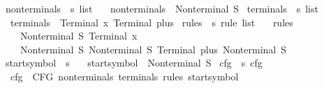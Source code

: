 \begin{isabellebody}
\isanewline
{}\isamarkupfalse%
\ nonterminals{}\ {\isacharcolon}{\kern0pt}{\isacharcolon}{\kern0pt}\ {\isachardoublequoteopen}s{}\ list{\isachardoublequoteclose}\ \isanewline
\ \ {\isachardoublequoteopen}nonterminals{}\ {\isacharequal}{\kern0pt}\ {\isacharbrackleft}{\kern0pt}Nonterminal\ S{\isacharbrackright}{\kern0pt}{\isachardoublequoteclose}\isanewline
\isanewline
{}\isamarkupfalse%
\ terminals{}\ {\isacharcolon}{\kern0pt}{\isacharcolon}{\kern0pt}\ {\isachardoublequoteopen}s{}\ list{\isachardoublequoteclose}\ \isanewline
\ \ {\isachardoublequoteopen}terminals{}\ {\isacharequal}{\kern0pt}\ {\isacharbrackleft}{\kern0pt}Terminal\ x{\isacharcomma}{\kern0pt}\ Terminal\ plus{\isacharbrackright}{\kern0pt}{\isachardoublequoteclose}\isanewline
\isanewline
{}\isamarkupfalse%
\ rules{}\ {\isacharcolon}{\kern0pt}{\isacharcolon}{\kern0pt}\ {\isachardoublequoteopen}s{}\ rule\ list{\isachardoublequoteclose}\ \isanewline
\ \ {\isachardoublequoteopen}rules{}\ {\isacharequal}{\kern0pt}\ {\isacharbrackleft}{\kern0pt}\isanewline
\ \ \ \ {\isacharparenleft}{\kern0pt}Nonterminal\ S{\isacharcomma}{\kern0pt}\ {\isacharbrackleft}{\kern0pt}Terminal\ x{\isacharbrackright}{\kern0pt}{\isacharparenright}{\kern0pt}{\isacharcomma}{\kern0pt}\isanewline
\ \ \ \ {\isacharparenleft}{\kern0pt}Nonterminal\ S{\isacharcomma}{\kern0pt}\ {\isacharbrackleft}{\kern0pt}Nonterminal\ S{\isacharcomma}{\kern0pt}\ Terminal\ plus{\isacharcomma}{\kern0pt}\ Nonterminal\ S{\isacharbrackright}{\kern0pt}{\isacharparenright}{\kern0pt}\isanewline
\ \ {\isacharbrackright}{\kern0pt}{\isachardoublequoteclose}\isanewline
\isanewline
{}\isamarkupfalse%
\ start{\isacharunderscore}{\kern0pt}symbol{}\ {\isacharcolon}{\kern0pt}{\isacharcolon}{\kern0pt}\ s{}\ \isanewline
\ \ {\isachardoublequoteopen}start{\isacharunderscore}{\kern0pt}symbol{}\ {\isacharequal}{\kern0pt}\ Nonterminal\ S{\isachardoublequoteclose}\isanewline
\isanewline
{}\isamarkupfalse%
\ cfg{}\ {\isacharcolon}{\kern0pt}{\isacharcolon}{\kern0pt}\ {\isachardoublequoteopen}s{}\ cfg{\isachardoublequoteclose}\ \isanewline
\ \ {\isachardoublequoteopen}cfg{}\ {\isacharequal}{\kern0pt}\ CFG\ nonterminals{}\ terminals{}\ rules{}\ start{\isacharunderscore}{\kern0pt}symbol{}{\isachardoublequoteclose}\isanewline

\end{isabellebody}
